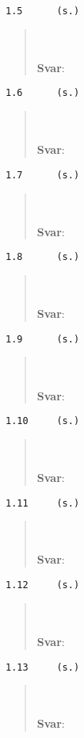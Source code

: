 \documentclass[a4paper]{article}
\newcommand{\tskcol}[1]{\textcolor{tskcol}{#1}}
\begin{document}
\texttt{\tskcol{1.5~~~~~ (s.)}}
\begin{quotation}
	\noindent
	\\ \\
	\textbf{Svar}:
\end{quotation}

\texttt{\tskcol{1.6~~~~~ (s.)}}
\begin{quotation}
	\noindent
	\\ \\
	\textbf{Svar}:
\end{quotation}

\texttt{\tskcol{1.7~~~~~ (s.)}}
\begin{quotation}
	\noindent
	\\ \\
	\textbf{Svar}:
\end{quotation}

\texttt{\tskcol{1.8~~~~~ (s.)}}
\begin{quotation}
	\noindent
	\\ \\
	\textbf{Svar}:
\end{quotation}

\texttt{\tskcol{1.9~~~~~ (s.)}}
\begin{quotation}
	\noindent
	\\ \\
	\textbf{Svar}:
\end{quotation}

\texttt{\tskcol{1.10~~~~ (s.)}}
\begin{quotation}
	\noindent
	\\ \\
	\textbf{Svar}:
\end{quotation}

\texttt{\tskcol{1.11~~~~ (s.)}}
\begin{quotation}
	\noindent
	\\ \\
	\textbf{Svar}:
\end{quotation}

\texttt{\tskcol{1.12~~~~ (s.)}}
\begin{quotation}
	\noindent
	\\ \\
	\textbf{Svar}:
\end{quotation}

\texttt{\tskcol{1.13~~~~ (s.)}}
\begin{quotation}
	\noindent
	\\ \\
	\textbf{Svar}:
\end{quotation}
\end{document}
